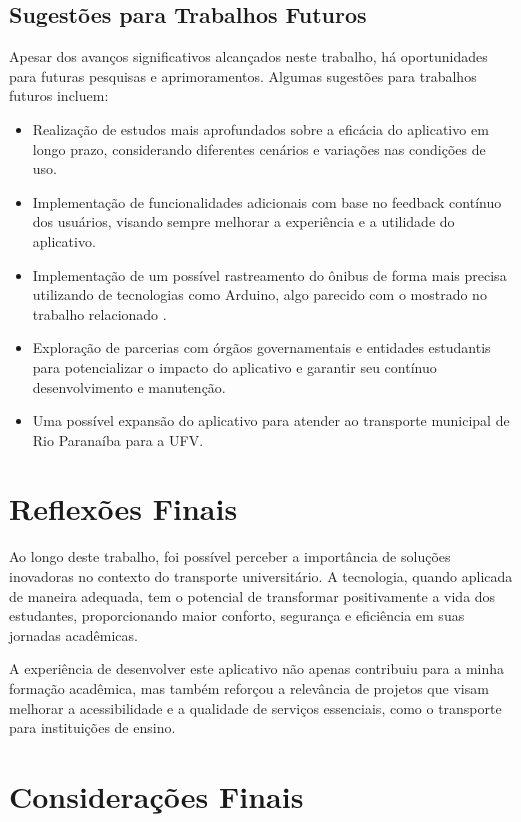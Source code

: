 \documentclass[
    12pt,                   %
    openright,              %
    oneside,                %
    a4paper,                %
    sumario=tradicional,    %
    english,                %
    brazil,                 %
    ]{abntex2}
\begin{document}
\subsection{Sugestões para Trabalhos Futuros}

Apesar dos avanços significativos alcançados neste trabalho, há oportunidades para futuras pesquisas e aprimoramentos. Algumas sugestões para trabalhos futuros incluem:
\begin{itemize}
	\item Realização de estudos mais aprofundados sobre a eficácia do aplicativo em longo prazo, considerando diferentes cenários e variações nas condições de uso.
	\item Implementação de funcionalidades adicionais com base no feedback contínuo dos usuários, visando sempre melhorar a experiência e a utilidade do aplicativo.
	\item Implementação de um possível rastreamento do ônibus de forma mais precisa utilizando de tecnologias como Arduino, algo parecido com o mostrado no trabalho relacionado \cite{miranda2019infraestrutura}.
	\item Exploração de parcerias com órgãos governamentais e entidades estudantis para potencializar o impacto do aplicativo e garantir seu contínuo desenvolvimento e manutenção.
	\item Uma possível expansão do aplicativo para atender ao transporte municipal de Rio Paranaíba para a UFV.
\end{itemize}

\section{Reflexões Finais}
\label{sec:reflexoes-finais}

Ao longo deste trabalho, foi possível perceber a importância de soluções inovadoras no contexto do transporte universitário. A tecnologia, quando aplicada de maneira adequada, tem o potencial de transformar positivamente a vida dos estudantes, proporcionando maior conforto, segurança e eficiência em suas jornadas acadêmicas.

A experiência de desenvolver este aplicativo não apenas contribuiu para a minha formação acadêmica, mas também reforçou a relevância de projetos que visam melhorar a acessibilidade e a qualidade de serviços essenciais, como o transporte para instituições de ensino.

\section{Considerações Finais}
\label{sec:consideracoes-finais}
\end{document}
